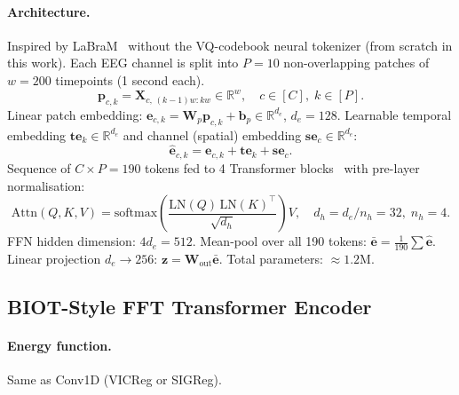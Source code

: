 \documentclass[11pt,a4paper]{article}
\begin{document}
\paragraph{Architecture.}
Inspired by LaBraM~\cite{labram} without the VQ-codebook neural tokenizer
(from scratch in this work).
Each EEG channel is split into $P{=}10$ non-overlapping patches of
$w{=}200$ timepoints (1 second each).
\begin{equation}
  \mathbf{p}_{c,k} = \mathbf{X}_{c,\, (k-1)w:kw} \in \mathbb{R}^{w},
  \quad c \in [C],\; k \in [P].
\end{equation}
Linear patch embedding: $\mathbf{e}_{c,k} = \mathbf{W}_p \mathbf{p}_{c,k}
+ \mathbf{b}_p \in \mathbb{R}^{d_e}$, $d_e{=}128$.
Learnable temporal embedding $\mathbf{te}_k \in \mathbb{R}^{d_e}$ and
channel (spatial) embedding $\mathbf{se}_c \in \mathbb{R}^{d_e}$:
\begin{equation}
  \hat{\mathbf{e}}_{c,k} = \mathbf{e}_{c,k} + \mathbf{te}_k + \mathbf{se}_c.
\end{equation}
Sequence of $C \times P = 190$ tokens fed to 4 Transformer
blocks~\cite{transformer} with pre-layer normalisation:
\begin{equation}
  \mathrm{Attn}(Q,K,V) = \mathrm{softmax}\!\left(
    \frac{\mathrm{LN}(Q)\,\mathrm{LN}(K)^\top}{\sqrt{d_h}}\right) V,
  \quad d_h = d_e/n_h = 32,\; n_h{=}4.
\end{equation}
FFN hidden dimension: $4 d_e = 512$.
Mean-pool over all 190 tokens: $\bar{\mathbf{e}} = \frac{1}{190}\sum \hat{\mathbf{e}}$.
Linear projection $d_e \to 256$: $\mathbf{z} = \mathbf{W}_\mathrm{out}\bar{\mathbf{e}}$.
Total parameters: $\approx 1.2$M.

\subsection{BIOT-Style FFT Transformer Encoder}
\label{sec:math_biot}

\paragraph{Energy function.}
Same as Conv1D (VICReg or SIGReg).
\end{document}
